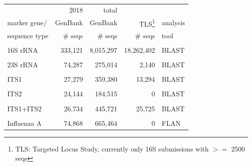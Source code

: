 \documentclass[landscape]{slides}
\begin{document}
\begin{slide}
\begin{center}
\begin{tabular}{l||r|r||r||l}
                                 &    2018  & total     &         &           \\
 marker gene/                    &  GenBank & GenBank   &  TLS\footnote{TLS: Targeted Locus Study, currently only 16S submissions with $>=$ 2500 seqs}      & analysis  \\
 sequence type                   &  \# seqs & \# seqs   & \# seqs & tool \\ \hline
& & & \\                    
16S rRNA                        & 333,121  & 8,015,297 & 18,262,402 & BLAST \\
& & & \\                    
 23S rRNA                        & 74,287  &   275,014  & 2,140      & BLAST \\
& & & \\
 ITS1                            & 27,279  &   359,380  & 13,294     & BLAST \\
& & & \\                    
 ITS2                            & 24,144  &   184,515  &      0     & BLAST \\
& & & \\                    
 ITS1+ITS2                       & 26,734  &   445,721  & 25,725     & BLAST \\
& & & \\                    
 Influenza A                     & 74,868  &   665,464  &      0     & FLAN \\
\end{tabular}
\end{center}
\vfill
\tiny {}
\end{slide}
\end{document}
